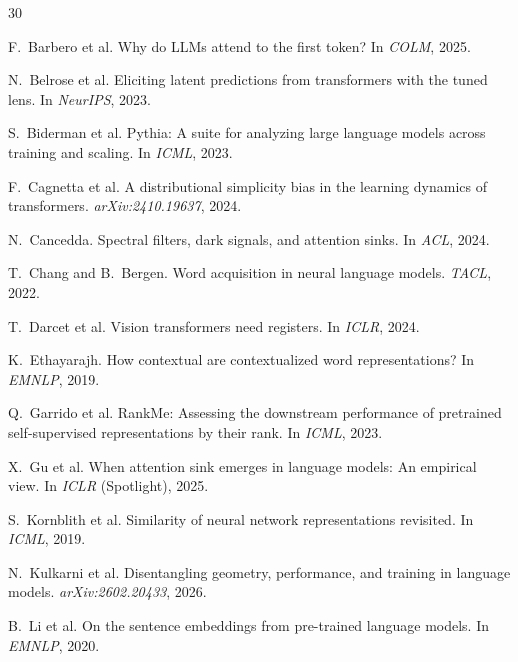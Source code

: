 \documentclass[11pt]{article}
\begin{document}

\begin{thebibliography}{30}

F.~Barbero et al. Why do LLMs attend to the first token? In \emph{COLM}, 2025.

N.~Belrose et al. Eliciting latent predictions from transformers with the tuned lens. In \emph{NeurIPS}, 2023.

S.~Biderman et al. Pythia: A suite for analyzing large language models across training and scaling. In \emph{ICML}, 2023.

F.~Cagnetta et al. A distributional simplicity bias in the learning dynamics of transformers. \emph{arXiv:2410.19637}, 2024.

N.~Cancedda. Spectral filters, dark signals, and attention sinks. In \emph{ACL}, 2024.

T.~Chang and B.~Bergen. Word acquisition in neural language models. \emph{TACL}, 2022.

T.~Darcet et al. Vision transformers need registers. In \emph{ICLR}, 2024.

K.~Ethayarajh. How contextual are contextualized word representations? In \emph{EMNLP}, 2019.

Q.~Garrido et al. RankMe: Assessing the downstream performance of pretrained self-supervised representations by their rank. In \emph{ICML}, 2023.

X.~Gu et al. When attention sink emerges in language models: An empirical view. In \emph{ICLR} (Spotlight), 2025.

S.~Kornblith et al. Similarity of neural network representations revisited. In \emph{ICML}, 2019.

N.~Kulkarni et al. Disentangling geometry, performance, and training in language models. \emph{arXiv:2602.20433}, 2026.

B.~Li et al. On the sentence embeddings from pre-trained language models. In \emph{EMNLP}, 2020.


\end{thebibliography}
\end{document}
